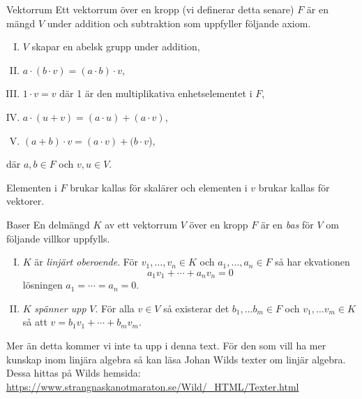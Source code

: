 \documentclass{article}
\theoremstyle{definition}
\begin{document}
\begin{mydef}{Vektorrum}{}
  Ett vektorrum över en kropp (vi definerar detta senare) $F$ är en mängd $V$ under addition och subtraktion som uppfyller följande axiom.
  \begin{enumerate}[I)]
    \item $V$ skapar en abelsk grupp under addition,
    \item $a \cdot (b \cdot v) = (a \cdot b) \cdot v$,
    \item $1 \cdot v = v$ där 1 är den multiplikativa enhetselementet i $F$,
    \item $a \cdot (u + v) = (a \cdot u) + (a \cdot v)$,
    \item $(a + b) \cdot v = (a \cdot v) + (b \cdot v$),
  \end{enumerate}
  där $a, b \in F$ och $v, u \in V$.
\end{mydef}
Elementen i $F$ brukar kallas för skalärer och elementen i $v$ 
brukar kallas för vektorer. 


\begin{mydef}{Baser}{}
  En delmängd $K$ av ett vektorrum $V$ över en kropp $F$ är en \textit{bas} för $V$ om följande villkor uppfylls.  
  \begin{enumerate}[I)]
    \item $K$ är \textit{linjärt oberoende}. För $v_1, \ldots, v_n \in K$ och $a_1, \ldots, a_n \in F$ så har ekvationen 
    \[a_1v_1 + \cdots + a_n v_n = 0\]
    lösningen $a_1 = \cdots = a_n = 0$.
    \item $K$ \textit{spänner upp} $V$. För alla $v \in V$ så existerar det $b_1, \ldots b_m \in F$ och $v_1, \ldots v_m \in K$ så att 
    $v = b_1 v_1 + \cdots + b_m v_m$.
  \end{enumerate}
\end{mydef}

Mer än detta kommer vi inte ta upp i denna text. För den som vill ha mer kunskap inom linjära algebra så kan läsa Johan Wilds 
texter om linjär algebra. Dessa hittas på Wilds hemsida: \url{https://www.strangnaskanotmaraton.se/Wild/_HTML/Texter.html}
\end{document}
